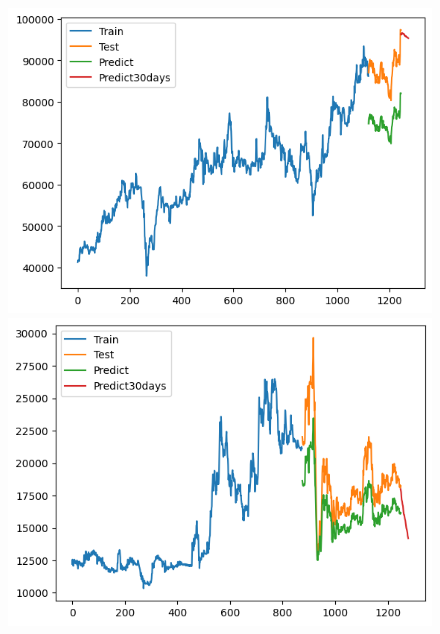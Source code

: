 \begin{figure}[H]
\begin{minipage}{0.15\textwidth}
    \end{minipage}
    \hfill
        \begin{minipage}{0.15\textwidth}
    \centering
    \includegraphics[width=1\textwidth]{resources/chapter-5/result/VCB_ RNN_9-1.png}
    \end{minipage}
    \hfill
    \begin{minipage}{0.15\textwidth}
    \centering
    \includegraphics[width=1\textwidth]{resources/chapter-5/result/EIB_ RNN_7-3.png}
    \end{minipage}
    \hfill
    \begin{minipage}{0.15\textwidth}
    \centering

\end{minipage}
\end{figure}

